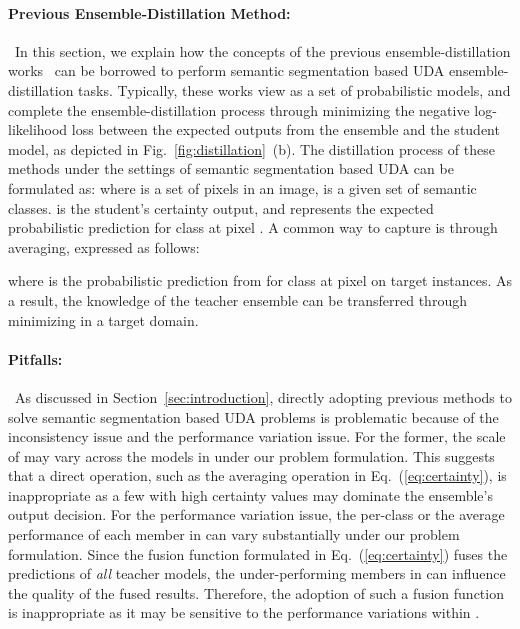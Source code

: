 \documentclass[final]{cvpr}
\begin{document}
\paragraph{Previous Ensemble-Distillation Method:}~In this section, we explain how the concepts of the previous ensemble-distillation works~\cite{bucilua2006model, hinton2015distilling, balan2015bayesian, cho2019efficacy, furlanello2018born, nguyen2020joint, orbes2019knowledge, liu2019structured} can be borrowed to perform semantic segmentation based UDA ensemble-distillation tasks. Typically, these works view  as a set of probabilistic models, and complete the ensemble-distillation process through minimizing the negative log-likelihood loss  between the expected outputs from the ensemble and the student model, as depicted in Fig.~\ref{fig:distillation}~(b). The distillation process of these methods under the settings of semantic segmentation based UDA can be formulated as:
 where  is a set of pixels in an image,  is a given set of semantic classes.  is the student's certainty output, and  represents the expected probabilistic prediction for class  at pixel . A common way to capture  is through averaging, expressed as follows:

 where  is the probabilistic prediction from  for class  at pixel  on target instances. As a result, the knowledge of the teacher ensemble can be transferred through minimizing  in a target domain.

\paragraph{Pitfalls:}~As discussed in Section~\ref{sec:introduction}, directly adopting previous methods to solve semantic segmentation based UDA problems is problematic because of the inconsistency issue and the performance variation issue. 
For the former, the scale of  may vary across the models in  under our problem formulation. This suggests that a direct operation, such as the averaging operation in Eq.~(\ref{eq:certainty}), is inappropriate as a few  with high certainty values may dominate the ensemble's output decision. For the performance variation issue, the per-class or the average performance of each member in  can vary substantially under our problem formulation. Since the fusion function formulated in Eq.~(\ref{eq:certainty}) fuses the predictions of \textit{all} teacher models, the under-performing members in  can influence the quality of the fused results. Therefore, the adoption of such a fusion function is inappropriate as it may be sensitive to the performance variations within .
\end{document}
